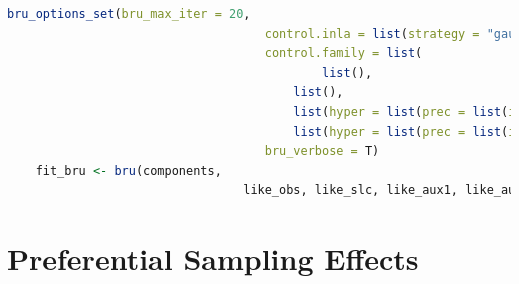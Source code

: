 \begin{lstlisting}[language = R]
	bru_options_set(bru_max_iter = 20,                
									control.inla = list(strategy = "gaussian", int.strategy = 'eb'),                
									control.family = list(
											list(), 
								    	list(), 
								     	list(hyper = list(prec = list(initial = 20, fixed=TRUE))),                  
								     	list(hyper = list(prec = list(initial = 20, fixed=TRUE)))),                
									bru_verbose = T)
	fit_bru <- bru(components, 
								 like_obs, like_slc, like_aux1, like_aux2)
\end{lstlisting} \label{code:inlabru_fit}

\section{Preferential Sampling Effects}